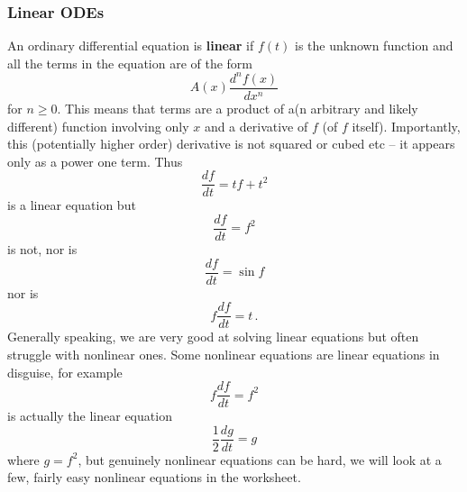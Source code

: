 \documentclass[12pt]{article}
\begin{document}
\subsubsection*{Linear ODEs}
An ordinary differential equation is \textbf{linear} if $f(t)$ is the unknown function and all the terms in the equation are of the form 
\[
A(x) \frac{d^{n}f(x)}{dx^n}
\]
for $n\geq 0$. This means that terms are a product of a(n arbitrary and likely different) function involving only $x$ and a derivative of $f$ (of $f$ itself). Importantly, this (potentially higher order) derivative is not squared or cubed etc -- it appears only as a power one term. Thus
\begin{equation*}
  \frac{df}{dt}=tf+t^2
\end{equation*}
is a linear equation but
\begin{equation*}
  \frac{df}{dt}=f^2
\end{equation*}
is not, nor is
\begin{equation*}
  \frac{df}{dt}=\sin{f}
\end{equation*}
nor is
\begin{equation*}
  f\frac{df}{dt}=t\,.
\end{equation*}
Generally speaking, we are very good at solving linear equations but often struggle with nonlinear ones. Some nonlinear equations are linear equations in disguise, for example
\begin{equation}
  f\frac{df}{dt}=f^2
\end{equation}
is actually the linear equation
\begin{equation}
  \frac{1}{2}\frac{dg}{dt}=g
\end{equation}
where $g=f^2$, but genuinely nonlinear equations can be hard, we will look at a few, fairly easy nonlinear equations in the worksheet.
\end{document}
